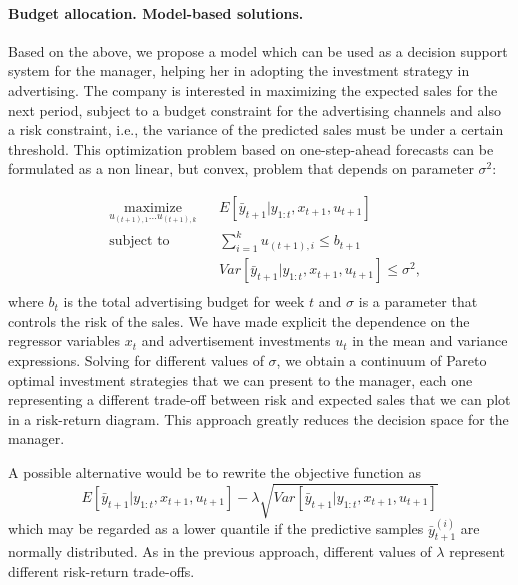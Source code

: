 

\paragraph{Budget allocation. Model-based solutions.}\label{section: budget allocation}

Based on the above, we propose a model which can be used as a decision support system for the manager, helping her in adopting the  investment strategy in advertising. The company is interested in maximizing the expected sales for the next period, subject to a budget constraint for the advertising channels and also a risk constraint, i.e., the variance of the predicted sales must be under a certain threshold.
This optimization problem based on one-step-ahead forecasts can be formulated as a non linear, but convex, problem that depends on  parameter $\sigma^2$:

\begin{equation*}
\begin{aligned}
& \underset{u_{(t+1),1}...u_{(t+1),k}}{\text{maximize}}
& &  E[ \bar{y}_{t+1} | y_{1:t}, x_{t+1}, u_{t+1}] \\
& \text{subject to}
& & \sum_{i=1}^k  u_{(t+1),i} \leq b_{t+1} \\
& & & Var[ \bar{y}_{t+1} | y_{1:t}, x_{t+1}, u_{t+1}] \leq \sigma^2, \\
\end{aligned}
\end{equation*}
where $b_t$ is the total advertising budget for week $t$ and $\sigma$ is a parameter that controls the risk of the sales. We have made explicit the dependence on the regressor variables $x_t$ and advertisement investments $u_t$ in the mean and variance expressions.
Solving for different values of $\sigma$, we obtain a continuum of Pareto optimal investment strategies that we can present to the manager, each one representing a different trade-off between risk and expected sales that we can plot in a risk-return diagram.
This approach greatly reduces the decision space for the manager.

A possible alternative would be to rewrite the objective function as 
$$E[ \bar{y}_{t+1} | y_{1:t}, x_{t+1}, u_{t+1}] - \lambda \sqrt{Var[ \bar{y}_{t+1} | y_{1:t}, x_{t+1}, u_{t+1}]}$$ 
which may be regarded as a lower quantile if the predictive samples $\bar{y}^{(i)}_{t+1}$ are normally distributed.
As in the previous approach, different values of $\lambda$ represent different risk-return trade-offs.

